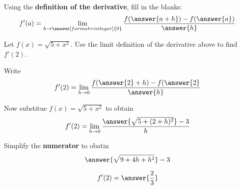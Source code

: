 \documentclass{ximera}
\begin{document}
\begin{exercise}

Using the \textbf{definition of the derivative}, fill in the blanks:
  \[
  f'(a)=
  \lim_{h\to\answer[format=integer]{0}}
  \frac{f(\answer{a+h})-f(\answer{a})}{\answer{h}}
  \]


\begin{exercise}
  Let $f(x)=\sqrt{5+x^2}$. Use the limit definition of the derivative
  above to find $f'(2)$.  
  \begin{exercise}
    Write
    \[
    f'(2) = \lim_{h\to 0}\frac{f(\answer{2}+h) -f(\answer{2}}{\answer{h}}
    \]
    \begin{exercise}
      Now substitue $f(x) = \sqrt{5+x^2}$ to obtain
      \[
      f'(2) = \lim_{h\to 0} \frac{\answer{\sqrt{5+(2+h)^2}}-3}{h}
      \]
      \begin{exercise}
        Simplify the \textbf{numerator} to obatin
        \[
        \answer{\sqrt{9 + 4h + h^2}}-3
        \]
      \end{exercise}
    \end{exercise}
  \end{exercise}
  
  
  \[
  f'(2)=\answer{\frac{2}{3}}
  \]
\end{exercise}

\end{exercise}
\end{document}
